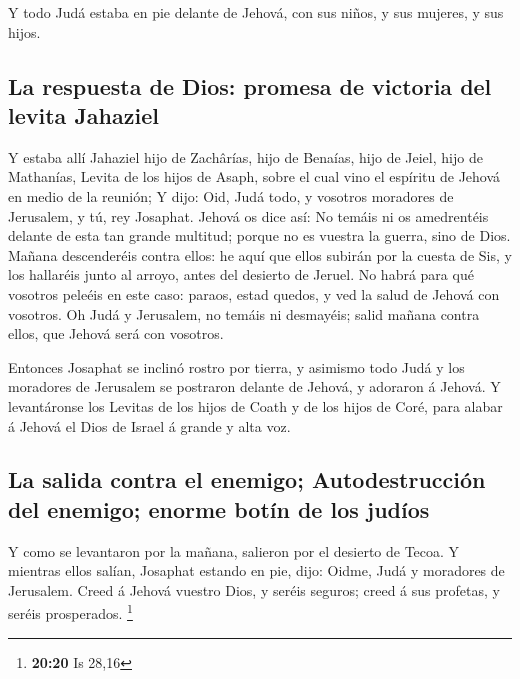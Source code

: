  Y todo Judá estaba en pie delante de Jehová, con sus
niños, y sus mujeres, y sus hijos.

\hypertarget{la-respuesta-de-dios-promesa-de-victoria-del-levita-jahaziel}{%
\subsection{La respuesta de Dios: promesa de victoria del levita
Jahaziel}\label{la-respuesta-de-dios-promesa-de-victoria-del-levita-jahaziel}}

 Y estaba allí Jahaziel hijo de Zachârías, hijo de Benaías,
hijo de Jeiel, hijo de Mathanías, Levita de los hijos de Asaph, sobre el
cual vino el espíritu de Jehová en medio de la reunión;  Y
dijo: Oid, Judá todo, y vosotros moradores de Jerusalem, y tú, rey
Josaphat. Jehová os dice así: No temáis ni os amedrentéis delante de
esta tan grande multitud; porque no es vuestra la guerra, sino de Dios.
 Mañana descenderéis contra ellos: he aquí que ellos
subirán por la cuesta de Sis, y los hallaréis junto al arroyo, antes del
desierto de Jeruel.  No habrá para qué vosotros peleéis en
este caso: paraos, estad quedos, y ved la salud de Jehová con vosotros.
Oh Judá y Jerusalem, no temáis ni desmayéis; salid mañana contra ellos,
que Jehová será con vosotros.

 Entonces Josaphat se inclinó rostro por tierra, y asimismo
todo Judá y los moradores de Jerusalem se postraron delante de Jehová, y
adoraron á Jehová.  Y levantáronse los Levitas de los hijos
de Coath y de los hijos de Coré, para alabar á Jehová el Dios de Israel
á grande y alta voz.

\hypertarget{la-salida-contra-el-enemigo-autodestrucciuxf3n-del-enemigo-enorme-botuxedn-de-los-juduxedos}{%
\subsection{La salida contra el enemigo; Autodestrucción del enemigo;
enorme botín de los
judíos}\label{la-salida-contra-el-enemigo-autodestrucciuxf3n-del-enemigo-enorme-botuxedn-de-los-juduxedos}}

 Y como se levantaron por la mañana, salieron por el
desierto de Tecoa. Y mientras ellos salían, Josaphat estando en pie,
dijo: Oidme, Judá y moradores de Jerusalem. Creed á Jehová vuestro Dios,
y seréis seguros; creed á sus profetas, y seréis prosperados.
\footnote{\textbf{20:20} Is 28,16}


